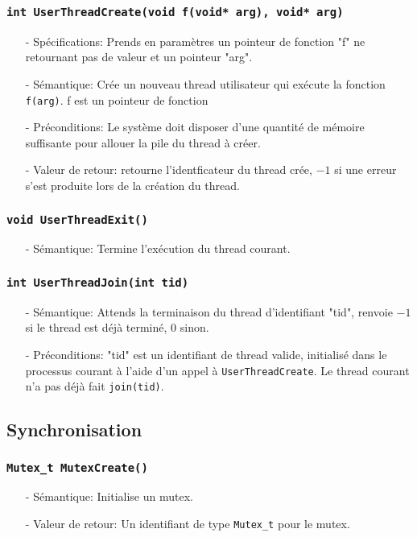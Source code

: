 \documentclass[11pt]{article}
\theoremstyle{definition}
\begin{document}
\subsubsection{\texttt{int UserThreadCreate(void f(void* arg), void* arg)}}
\begin{itemize}
\item[-] Spécifications: Prends en paramètres un pointeur de fonction "f" ne retournant pas de valeur
  et un pointeur "arg".
\item[-] Sémantique: Crée un nouveau thread utilisateur qui exécute la fonction \texttt{f(arg)}.
  f est un pointeur de fonction 
\item[-] Préconditions: Le système doit disposer d'une quantité de mémoire suffisante pour allouer la
  pile du thread à créer. 
\item[-] Valeur de retour: retourne l'identficateur du thread crée, $-1$ si une erreur s'est produite lors de
  la création du thread.
\end{itemize}

\subsubsection{\texttt{void UserThreadExit()}}
\begin{itemize}
\item[-] Sémantique: Termine l'exécution du thread courant.
\end{itemize}

\subsubsection{\texttt{int UserThreadJoin(int tid)}}
\begin{itemize}
\item[-] Sémantique: Attends la terminaison du thread d'identifiant "tid", renvoie $-1$
  si le thread est déjà terminé, $0$ sinon.
\item[-] Préconditions: "tid" est un identifiant de thread valide, initialisé dans le processus courant
  à l'aide d'un appel à \texttt{UserThreadCreate}. Le thread courant n'a pas déjà fait \texttt{join(tid)}.
\end{itemize}

\subsection{Synchronisation}
\subsubsection{\texttt{Mutex\_t MutexCreate()}}
\begin{itemize}
\item[-]Sémantique: Initialise un mutex.
\item[-]Valeur de retour: Un identifiant de type \texttt{Mutex\_t} pour le mutex.
\end{itemize}
\end{document}
